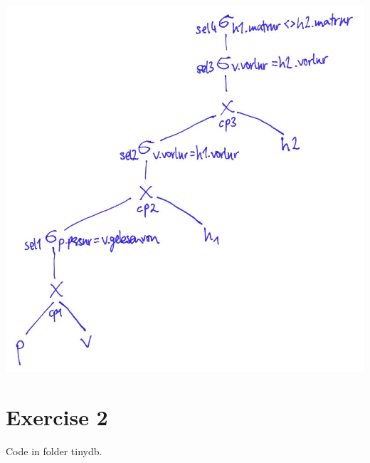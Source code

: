 \documentclass[11pt,a4paper]{scrartcl}
\begin{document}
\includegraphics[scale=1]{part2b.jpg}


\section*{Exercise 2}
Code in folder tinydb.
\end{document}
